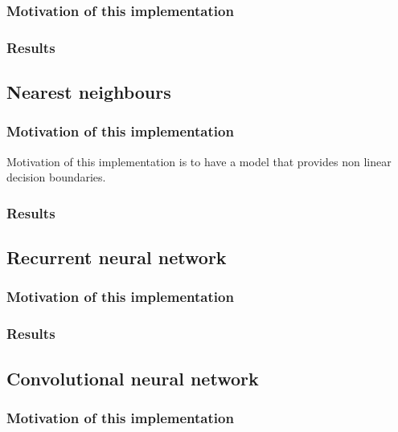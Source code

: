 \documentclass{article}
\begin{document}
    \subsubsection{Motivation of this implementation}

    \subsubsection{Results}

    \subsection{Nearest neighbours}\label{subsec:nearest-neigbours}

    \subsubsection{Motivation of this implementation}
    Motivation of this implementation is to have a model that provides non linear decision boundaries.

    \subsubsection{Results}

    \subsection{Recurrent neural network}\label{subsec:recurrent-neural-network}

    \subsubsection{Motivation of this implementation}

    \subsubsection{Results}

    \subsection{Convolutional neural network}\label{subsec:convolutional-neural-network}

    \subsubsection{Motivation of this implementation}
\end{document}
